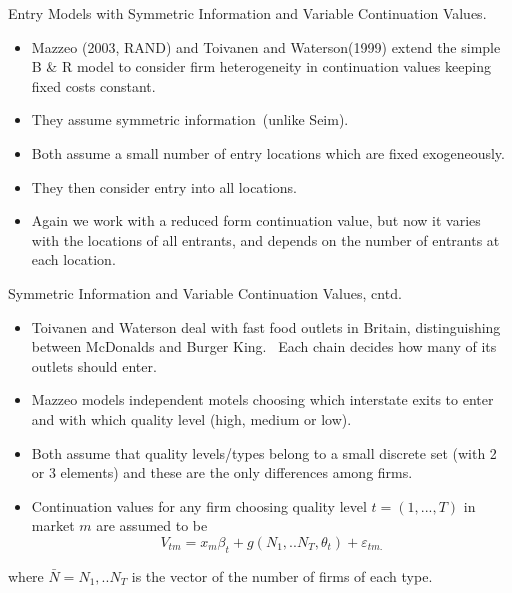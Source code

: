 \documentclass[xcolor=pdftex,dvipsnames,table,mathserif]{beamer}
\begin{document}
\begin{frame}{Entry Models with Symmetric Information and Variable
Continuation Values.}
\begin{itemize}
\item Mazzeo (2003, RAND) and Toivanen and Waterson(1999) extend the simple
B \& R model to consider firm heterogeneity in continuation values keeping
fixed costs constant.
\item They assume symmetric information\ (unlike Seim).
\item Both assume a small number of entry locations which are fixed
exogeneously.
\item They then consider entry into all locations.
\item Again we work with a reduced form continuation value, but now it
varies with the locations of all entrants, and depends on the number of
entrants at each location.
\end{itemize}
\end{frame}

\begin{frame}{Symmetric Information and Variable Continuation Values,
cntd.}
\begin{itemize}
\item Toivanen and Waterson deal with fast food outlets in Britain,
distinguishing between McDonalds and Burger King. \ Each chain decides how
many of its outlets should enter.
\item Mazzeo models independent motels choosing which interstate exits to
enter and with which quality level (high, medium or low).
\item Both assume that quality levels/types belong to a small discrete set
(with 2 or 3 elements) and these are the only differences among firms.
\item Continuation values for any firm choosing quality level $t=(1,...,T)$
in market $m$ are assumed to be 
\begin{equation*}
V_{tm}=x_{m}\beta _{t}+g(N_{1},..N_{T},\theta _{t})+\varepsilon _{tm.}
\end{equation*}
\end{itemize}
where $\bar{N}=N_{1},..N_{T}$ is the vector of the number of firms of each
type.
\end{frame}
\end{document}
